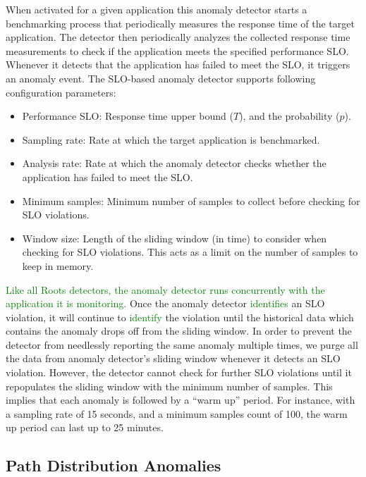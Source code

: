 When activated for a given application this anomaly detector starts a benchmarking process
that periodically measures the response time of the target application. The detector then periodically
analyzes the collected response time measurements to check if the application meets the specified performance
SLO. Whenever it detects that the application has failed to meet the SLO, it triggers an anomaly event. 
The SLO-based anomaly detector supports following configuration parameters:
\begin{itemize}
\item Performance SLO: Response time upper bound ($T$), and the probability ($p$).
\item Sampling rate: Rate at which the target application is benchmarked.
\item Analysis rate: Rate at which the anomaly detector checks whether the application has failed to meet the SLO.
\item Minimum samples: Minimum number of samples to collect before checking for SLO violations.
\item Window size: Length of the sliding window (in time) to consider when checking for SLO violations. This
acts as a limit on the number of samples to keep in memory.
\end{itemize}

\textcolor{green}{Like all Roots detectors, the anomaly detector runs
concurrently with the application it is monitoring.}
Once the anomaly detector 
\textcolor{green}{identifies} 
an SLO violation, it will continue to 
\textcolor{green}{identify}
the violation
until the historical data which contains the anomaly drops off from the sliding window. 
In order to prevent the detector from needlessly reporting the same anomaly multiple times,
we purge all the data from anomaly detector's sliding window whenever it detects an SLO violation.
However, the detector cannot check for further SLO violations until it repopulates the sliding window 
with the minimum number of samples. This implies that each anomaly is followed by a ``warm up'' period.
For instance, with a sampling rate of 15 seconds, and a minimum
samples count of 100, the warm up period can last up to 25 minutes.

\subsection{Path Distribution Anomalies}

